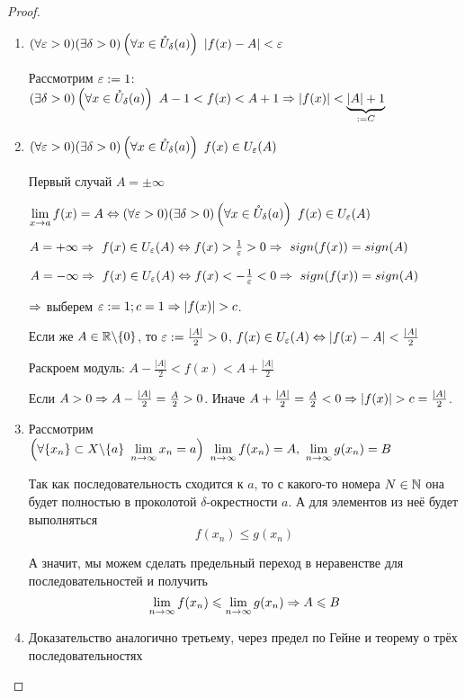 \begin{proof}
\begin{enumerate}
	\item $(\forall \varepsilon > 0)(\exists \delta > 0) \left(\forall x \in \mathring{U}_{\delta}(a) \right) \  |f(x) - A| < \varepsilon$

	Рассмотрим $\varepsilon := 1$: $(\exists \delta > 0) \left(\forall x \in \mathring{U}_{\delta}(a)\right)\ A - 1 < f(x) < A + 1 \Rightarrow |f(x)| < \underbrace{|A| + 1}_{:= C}$
	
	\item $(\forall \varepsilon > 0)(\exists \delta > 0)\left( \forall x \in \mathring{U}_{\delta}(a) \right) \ f(x) \in U_{\varepsilon}(A)$
	
	Первый случай $A = \pm \infty$
	
	$\lim\limits_{x \to a}f(x) = A \Leftrightarrow (\forall \varepsilon > 0)
	(\exists \delta > 0)\left(\forall x \in \mathring{U}_{\delta}(a)\right)
	\ f(x) \in U_\varepsilon (A)$

	$A = +\infty \Rightarrow \ f(x) \in U_\varepsilon (A) \Leftrightarrow f(x) > \frac{1}{\varepsilon} > 0 \Rightarrow \ sign(f(x)) = sign(A)$

	$A = -\infty \Rightarrow \ f(x) \in U_\varepsilon (A) \Leftrightarrow f(x) < - \frac{1}{\varepsilon} < 0 \Rightarrow \ sign(f(x)) = sign(A)$

	$\Rightarrow$ выберем $\varepsilon := 1; c = 1 \Rightarrow |f(x)| > c$.

	Если же $A \in \mathbb{R} \backslash \{0\}$, то $\varepsilon := \frac{|A|}{2} > 0$, $f(x) \in U_{\varepsilon}(A) \Leftrightarrow |f(x) - A| < \frac{|A|}{2}$
	
	Раскроем модуль: $A - \frac{|A|}{2} < f(x) < A + \frac{|A|}{2}$
	
	Если $A > 0 \Rightarrow A - \frac{|A|}{2} = \frac{A}{2} > 0$. Иначе $A + \frac{|A|}{2} = \frac{A}{2} < 0 \Rightarrow |f(x)| > c = \frac{|A|}{2}$.
	
	\item Рассмотрим $\left(\forall \{x_n\}
	\subset X \backslash \{a\}\ \lim\limits_{n \to \infty} x_n = a\right)
	\ \lim\limits_{n \to \infty} f(x_n) = A,\ \lim\limits_{n \rightarrow \infty} g(x_n) = B$
	
	Так как последовательность сходится к $a$, то с какого-то номера $N \in \mathbb{N}$ она будет полностью в проколотой $\delta$-окрестности $a$. А для элементов из неё будет выполняться
	\[
		f(x_n) \le g(x_n)
	\]
	
	А значит, мы можем сделать предельный переход в неравенстве для последовательностей и получить
	\[
		\lim\limits_{n \to \infty} f(x_n) \leqslant \lim\limits_{n \to \infty} g(x_n) \Rightarrow A \leqslant B
	\]
	
	\item Доказательство аналогично третьему, через предел по Гейне и теорему о трёх последовательностях
\end{enumerate}
\end{proof}

